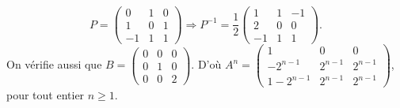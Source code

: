 \begin{question}
\begin{explanations}
$$P= \left(\begin{array}{rcc}
0&1&0\\1&0&1\\ -1&1&1\end{array}\right) \Rightarrow P^{-1}= \frac{1}{2}\left(\begin{array}{rcc}
1&1&-1\\2&0&0\\ 
-1&1&1\end{array}\right).$$
On vérifie aussi que $B=\left(\begin{array}{rcc}0&0&0\\0&1&0\\ 
0&0&2\end{array}\right)$. D'où $A^n= \left(\begin{array}{rcc}
1&0&0\\-2^{n-1}&2^{n-1}&2^{n-1}\\ 
1-2^{n-1}&2^{n-1}&2^{n-1}\end{array}\right)$, pour tout entier $n\ge1$.
\end{explanations}
\end{question}

